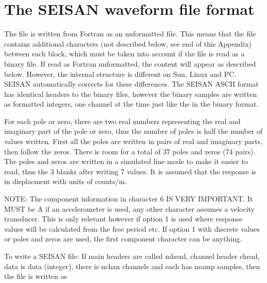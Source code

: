 \chapter{The SEISAN waveform file format}
\label{app:seisan-format}

The file is written from Fortran as an unformatted file. This means that the file contains additional characters (not described below, see end of this Appendix) between each block, which must be taken into account if the file is read as a binary file. If read as Fortran unformatted, the content will appear as described below. However, the internal structure is different on Sun, Linux and PC. SEISAN automatically corrects for these differences. The SEISAN ASCII format has identical headers to the binary files, however the binary samples are written as formatted integers, one channel at the time just like the in the binary format. 



For each pole or zero, there are two real numbers representing the real and imaginary part of the pole or zero, thus the number of poles is half the number of values written. First all the poles are written in pairs of real and imaginary parts, then follow the zeros. There is room for a total of 37 poles and zeros (74 pairs). The poles and zeros are written in a simulated line mode to make it easier to read, thus the 3 blanks after writing 7 values. It is assumed that the response is in displacment with units of counts/m. 



NOTE: The component information in character 6 IS VERY IMPORTANT. It MUST be A if an accelerometer is used, any other character assumes a velocity transducer. This is only relevant however if option 1 is used where response values will be calculated from the free period etc. If option 1 with discrete values or poles and zeros are used, the first component character can be anything. 



To write a SEISAN file: If main headers are called mhead, channel header chead, data is data (integer), there is nchan channels and each has nsamp samples, then the file is written as 

